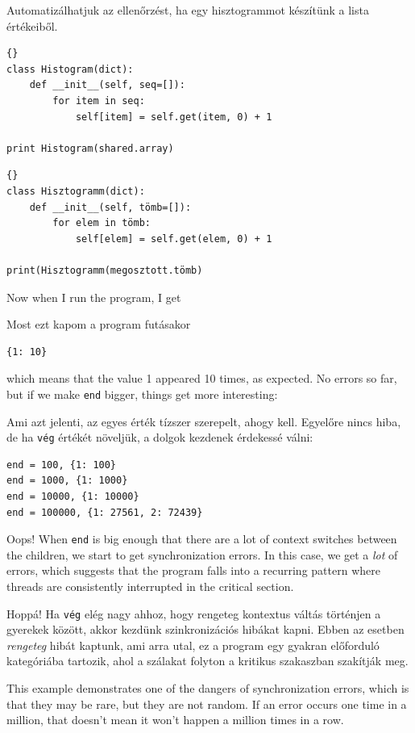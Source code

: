\documentclass{book}
\begin{document}
Automatizálhatjuk az ellenőrzést, ha egy hisztogrammot
készítünk a lista értékeiből.

\begin{lstlisting}[title={}]{}
class Histogram(dict):
    def __init__(self, seq=[]):
        for item in seq:
            self[item] = self.get(item, 0) + 1

print Histogram(shared.array)
\end{lstlisting}

\begin{lstlisting}[title={}]{}
class Hisztogramm(dict):
    def __init__(self, tömb=[]):
        for elem in tömb:
            self[elem] = self.get(elem, 0) + 1

print(Hisztogramm(megosztott.tömb)
\end{lstlisting}
Now when I run the program, I get

Most ezt kapom a program futásakor

\begin{verbatim}
{1: 10}
\end{verbatim}
%
which means that the value 1 appeared 10 times, as expected.  No
errors so far, but if we make {\tt end} bigger, things get more
interesting:

Ami azt jelenti, az egyes érték tízszer szerepelt, ahogy kell.
Egyelőre nincs hiba, de ha {\tt vég} értékét növeljük, a dolgok
kezdenek érdekessé válni:

\begin{verbatim}
end = 100, {1: 100}
end = 1000, {1: 1000}
end = 10000, {1: 10000}
end = 100000, {1: 27561, 2: 72439}
\end{verbatim}
%
Oops!  When {\tt end} is big enough that there are a lot of
context switches between the children, we start to get synchronization
errors.  In this case, we get a {\em lot} of errors, which suggests
that the program falls into a recurring pattern where threads are 
consistently interrupted in the critical section.

Hoppá! Ha {\tt vég} elég nagy ahhoz, hogy rengeteg kontextus váltás
történjen a gyerekek között, akkor kezdünk szinkronizációs hibákat kapni.
Ebben az esetben {\em rengeteg} hibát kaptunk, ami arra utal, ez a
program egy gyakran előforduló kategóriába tartozik, ahol a
szálakat folyton a kritikus szakaszban szakítják meg.

This example demonstrates one of the dangers of synchronization
errors, which is that they may be rare, but they are not random.
If an error occurs one time in a million, that doesn't mean it
won't happen a million times in a row.
\end{document}
